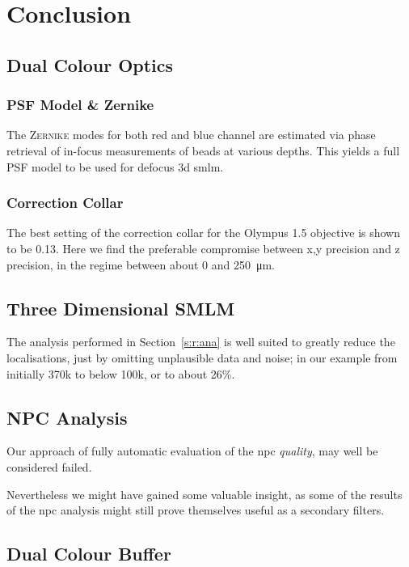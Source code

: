 \documentclass[11pt, a4paper, oneside, twocolumn]{report}
\newcommand{\e}{\emph}
\begin{document}
\chapter{Conclusion}


\section{Dual Colour Optics}


\subsection{PSF Model \& Zernike}

The \textsc{Zernike} modes for both red and blue channel are estimated
via phase retrieval of in-focus measurements of beads at various
depths. This yields a full PSF model to be used for defocus 3d
\gls{smlm}.


\subsection{Correction Collar}

The best setting of the correction collar for the Olympus
\SI{1.5}{\NA} objective is shown to be 0.13. Here we find the
preferable compromise between x,y precision and z precision, in the
regime between about 0 and \SI{250}{\micro\meter}.


\section{Three Dimensional SMLM}

The analysis performed in Section~\ref{s:r:ana} is well suited to
greatly reduce the localisations, just by omitting unplausible data
and noise; in our example from initially 370k to below 100k, or to
about 26\%.


\section{NPC Analysis}

Our approach of fully automatic evaluation of the \gls{npc}
\e{quality}, may well be considered failed.

Nevertheless we might have gained some valuable insight, as some of
the results of the \gls{npc} analysis might still prove themselves
useful as a secondary filters.


\section{Dual Colour Buffer}
\end{document}
